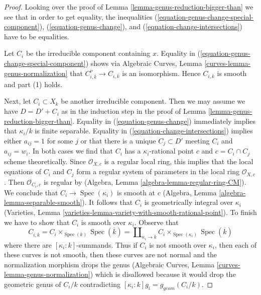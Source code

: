 \documentclass{stacks-project}
\theoremstyle{plain}
\theoremstyle{definition}
\theoremstyle{remark}
\numberwithin{equation}{subsection}
\def\Spec{\mathop{\mathrm{Spec}}}
\begin{document}
\begin{proof}
Looking over the proof of Lemma \ref{lemma-genus-reduction-bigger-than}
we see that in order to get equality, the inequalities
(\ref{equation-genus-change-special-component}),
(\ref{equation-genus-change}), and
(\ref{equation-change-intersections})
have to be equalities.

\medskip\noindent
Let $C_i$ be the irreducible component containing $x$.
Equality in (\ref{equation-genus-change-special-component})
shows via
Algebraic Curves, Lemma \ref{curves-lemma-genus-normalization}
that $C_{i, \overline{k}}^\nu \to C_{i, \overline{k}}$ is
an isomorphism. Hence $C_{i, \overline{k}}$ is smooth
and part (1) holds.

\medskip\noindent
Next, let $C_i \subset X_k$ be another irreducible component.
Then we may assume we have $D =  D' + C_i$ as in the induction step
in the proof of Lemma \ref{lemma-genus-reduction-bigger-than}.
Equality in (\ref{equation-genus-change}) immediately implies
that $\kappa_i/k$ is finite separable.
Equality in (\ref{equation-change-intersections})
implies either $a_{ij} = 1$ for some $j$ or that there is a
unique $C_j \subset D'$ meeting $C_i$ and $a_{ij} = w_i$.
In both cases we find that $C_i$ has a $\kappa_i$-rational point
$c$ and $c = C_i \cap C_j$ scheme theoretically.
Since $\mathcal{O}_{X, c}$ is a regular local ring,
this implies that the local equations of $C_i$ and $C_j$
form a regular system of parameters in the local ring $\mathcal{O}_{X, c}$.
Then $\mathcal{O}_{C_i, c}$ is regular by
(Algebra, Lemma \ref{algebra-lemma-regular-ring-CM}).
We conclude that $C_i \to \Spec(\kappa_i)$ is smooth at $c$
(Algebra, Lemma \ref{algebra-lemma-separable-smooth}).
It follows that $C_i$ is geometrically integral over $\kappa_i$
(Varieties, Lemma \ref{varieties-lemma-variety-with-smooth-rational-point}).
To finish we have to show that $C_i$ is smooth over $\kappa_i$. Observe that
$$
C_{i, \overline{k}} = C_i \times_{\Spec(k)} \Spec(\overline{k})
= \coprod\nolimits_{\kappa_i \to \overline{k}}
C_i \times_{\Spec(\kappa_i)} \Spec(\overline{k})
$$
where there are $[\kappa_i : k]$-summands. Thus if $C_i$ is not
smooth over $\kappa_i$, then each of these curves is not smooth, then
these curves are not normal and the normalization morphism drops the genus
(Algebraic Curves, Lemma \ref{curves-lemma-genus-normalization})
which is disallowed because it would drop the geometric genus
of $C_i/k$ contradicting $[\kappa_i : k] g_i = g_{geom}(C_i/k)$.
\end{proof}
\end{document}
